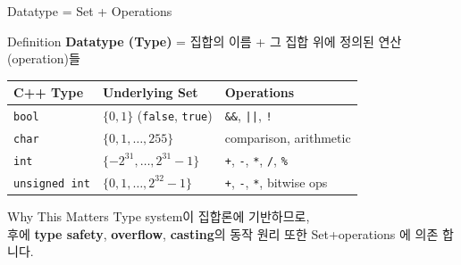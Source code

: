 \documentclass{beamer}
\begin{document}
\begin{frame}[t]{Datatype = Set + Operations}
    \small
    \vspace{0.1cm}
    \begin{block}{Definition}
        \footnotesize
        \textbf{Datatype (Type)} = 집합의 이름 + 그 집합 위에 정의된 연산(operation)들
    \end{block}

    \vspace{0.15cm}
    \footnotesize
    \renewcommand{\arraystretch}{1.4}
    \begin{tabular}{lll}
        \toprule
        \textbf{C++ Type} & \textbf{Underlying Set} & \textbf{Operations} \\
        \midrule
        \texttt{bool} & $\{0, 1\}$ (\texttt{false}, \texttt{true}) & \texttt{\&\&}, \texttt{||}, \texttt{!} \\
        \texttt{char} & $\{0, 1, \ldots, 255\}$ & comparison, arithmetic \\
        \texttt{int} & $\{-2^{31}, \ldots, 2^{31}{-}1\}$ & \texttt{+}, \texttt{-}, \texttt{*}, \texttt{/}, \texttt{\%} \\
        \texttt{unsigned int} & $\{0, 1, \ldots, 2^{32}{-}1\}$ & \texttt{+}, \texttt{-}, \texttt{*}, bitwise ops \\
        \bottomrule
    \end{tabular}
    \renewcommand{\arraystretch}{1}

    \vspace{0.2cm}
    \begin{exampleblock}{Why This Matters}
        \footnotesize
        Type system이 집합론에 기반하므로,\\
        후에 \textbf{type safety}, \textbf{overflow}, \textbf{casting}의 동작 원리 또한 Set+operations 에 의존 합니다.
    \end{exampleblock}
\end{frame}
\end{document}
